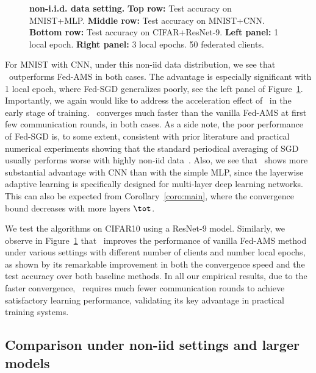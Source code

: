 \documentclass[twoside]{article}
\begin{document}
\begin{figure}[t!]
\begin{center}
{        }
    \end{center}
    \vspace{0.05in}
	\caption{\textbf{non-i.i.d. data setting.} \textbf{Top row:} Test accuracy on MNIST+MLP. 
	\textbf{Middle row:} Test accuracy on MNIST+CNN. 
	\textbf{Bottom row:} Test accuracy on CIFAR+ResNet-9.
	\textbf{Left panel:} 1 local epoch. \textbf{Right panel:} 3 local epochs. 50 federated clients.}
	\label{fig:noniid}
	\vspace{-0.1in}
\end{figure}


For MNIST with CNN, under this non-iid data distribution, we see that \algo\ outperforms Fed-AMS in both cases. The advantage is especially significant with 1 local epoch, where Fed-SGD generalizes poorly, see the left panel of Figure~\ref{fig:noniid}. 
Importantly, we again would like to address the acceleration effect of \algo\, in the early stage of training. \algo\ converges much faster than the vanilla Fed-AMS at first few communication rounds, in both cases. 
As a side note, the poor performance of Fed-SGD is, to some extent, consistent with prior literature and practical numerical experiments showing that the standard periodical averaging of SGD usually performs worse with highly non-iid data~\cite{chen2020toward,reddi2020adaptive}. Also, we see that \algo\ shows more substantial advantage with CNN than with the simple MLP, since the layerwise adaptive learning is specifically designed for multi-layer deep learning networks. This can also be expected from Corollary~\ref{coro:main}, where the convergence bound decreases with more layers $\tot$.


We test the algorithms on CIFAR10 using a ResNet-9 model. 
Similarly, we observe in Figure~\ref{fig:noniid} that \algo\ improves the performance of vanilla Fed-AMS method under various settings with different number of clients and number local epochs, as shown by its remarkable improvement in both the convergence speed and the test accuracy over both baseline methods. In all our empirical results, due to the faster convergence, \algo\ requires much fewer communication rounds to achieve satisfactory learning performance, validating its key advantage in practical training systems.



\subsection{Comparison under non-iid settings and larger models}
\end{document}
